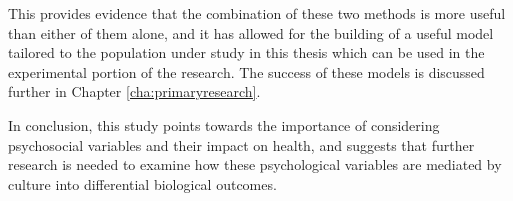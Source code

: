 \documentclass{article}
\begin{document}
This provides evidence that the combination of these two methods is more useful than either of them alone, and it has allowed for the building of a useful model tailored to the population under study in this thesis which can be used in the experimental portion of the research. The success of these models is discussed further in Chapter \ref{cha:primaryresearch}.


In conclusion, this study points towards the importance of considering
psychosocial variables and their impact on health, and suggests that
further research is needed to examine how these psychological variables
are mediated by culture into differential biological outcomes.









\end{document}
